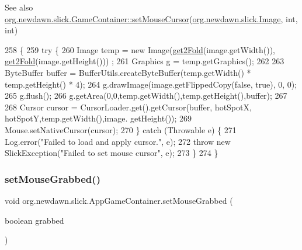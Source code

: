 \begin{DoxySeeAlso}{See also}
\mbox{\hyperlink{classorg_1_1newdawn_1_1slick_1_1_game_container_a13e789e67755f14bad1caf70e3bd6d4e}{org.\+newdawn.\+slick.\+Game\+Container\+::set\+Mouse\+Cursor}}(\mbox{\hyperlink{classorg_1_1newdawn_1_1slick_1_1_image}{org.\+newdawn.\+slick.\+Image}}, int, int) 
\end{DoxySeeAlso}

\begin{DoxyCode}
258                                                                                               \{
259         \textcolor{keywordflow}{try} \{
260             Image temp = \textcolor{keyword}{new} Image(\mbox{\hyperlink{classorg_1_1newdawn_1_1slick_1_1_app_game_container_afb2ee604fe80d51043a90848472a7e11}{get2Fold}}(image.getWidth()), \mbox{\hyperlink{classorg_1_1newdawn_1_1slick_1_1_app_game_container_afb2ee604fe80d51043a90848472a7e11}{get2Fold}}(image.getHeight()))
      ;
261             Graphics g = temp.getGraphics();
262             
263             ByteBuffer buffer = BufferUtils.createByteBuffer(temp.getWidth() * temp.getHeight() * 4);
264             g.drawImage(image.getFlippedCopy(\textcolor{keyword}{false}, \textcolor{keyword}{true}), 0, 0);
265             g.flush();
266             g.getArea(0,0,temp.getWidth(),temp.getHeight(),buffer);
267             
268             Cursor cursor = CursorLoader.get().getCursor(buffer, hotSpotX, hotSpotY,temp.getWidth(),image.
      getHeight());
269             Mouse.setNativeCursor(cursor);
270         \} \textcolor{keywordflow}{catch} (Throwable e) \{
271             Log.error(\textcolor{stringliteral}{"Failed to load and apply cursor."}, e);
272             \textcolor{keywordflow}{throw} \textcolor{keyword}{new} SlickException(\textcolor{stringliteral}{"Failed to set mouse cursor"}, e);
273         \}
274     \}
\end{DoxyCode}
\mbox{\label{classorg_1_1newdawn_1_1slick_1_1_app_game_container_a526b149913ec344cf7b34043d5dd126c}} 
\subsubsection{\texorpdfstring{set\+Mouse\+Grabbed()}{setMouseGrabbed()}}
{\footnotesize\ttfamily void org.\+newdawn.\+slick.\+App\+Game\+Container.\+set\+Mouse\+Grabbed (\begin{DoxyParamCaption}\item[{boolean}]{grabbed }\end{DoxyParamCaption})\hspace{0.3cm}{\ttfamily [inline]}}


